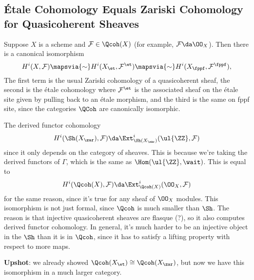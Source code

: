 \hypertarget{uxe9tale-cohomology-equals-zariski-cohomology-for-quasicoherent-sheaves}{%
\subsection{Étale Cohomology Equals Zariski Cohomology for Quasicoherent
Sheaves}\label{uxe9tale-cohomology-equals-zariski-cohomology-for-quasicoherent-sheaves}}

\begin{theorem}\label{thm:et_qcs_zar}

Suppose \(X\) is a scheme and \(\mathcal{F}\in \Qcoh(X)\) (for example,
\(\mathcal{F} \da \OO_X\)). Then there is a canonical isomorphism
\begin{align*}  
H^i(X, \mathcal{F}) \mapsvia{\sim} H^i(X_\et, \mathcal{F}^{\et}) \mapsvia{\sim} H^i(X_{\fppf}, \mathcal{F}^{\fppf})
,\end{align*} The first term is the usual Zariski cohomology of a
quasicoherent sheaf, the second is the étale cohomology where
\(\mathcal{F}^{\et}\) is the associated sheaf on the étale site given by
pulling back to an étale morphism, and the third is the same on fppf
site, since the categories \(\QCoh\) are canonically isomorphic.

\end{theorem}

\begin{remark}

The derived functor cohomology
\begin{align*}
H^i(\Sh(X_{\zar}), \mathcal{F}) \da \Ext^i_{\Sh(X_\zar)}(\ul{\ZZ}, \mathcal{F})
\end{align*} since it only depends on the category of sheaves. This is
because we're taking the derived functors of \(\Gamma\), which is the
same as \(\Hom(\ul{\ZZ}, \wait)\). This is equal to
\begin{align*}
H^i(\Qcoh(X), \mathcal{F}) \da \Ext^i_{\Qcoh(X)}(\OO_X, \mathcal{F})
\end{align*} for the same reason, since it's true for any sheaf of
\(\OO_X\) modules. This isomorphism is not just formal, since \(\Qcoh\)
is much smaller than \(\Sh\). The reason is that injective quasicoherent
sheaves are flasque (?), so it also computes derived functor cohomology.
In general, it's much harder to be an injective object in the \(\Sh\)
than it is in \(\Qcoh\), since it has to satisfy a lifting property with
respect to more maps.

\textbf{Upshot}: we already showed \(\Qcoh(X_\et) \cong \Qcoh(X_\zar)\),
but now we have this isomorphism in a much larger category.

\end{remark}


